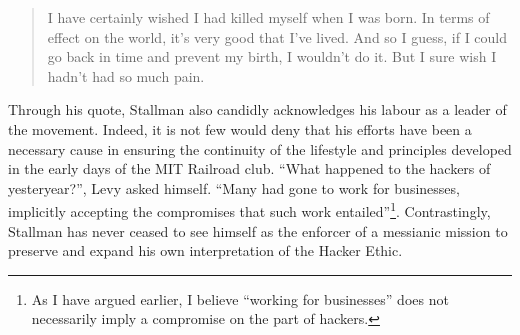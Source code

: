 \begin{quote}
I have certainly wished I had killed myself when I was born. In terms of effect on the world, it's very good that I've lived. And so I guess, if I could go back in time and prevent my birth, I wouldn't do it. But I sure wish I hadn't had so much pain. \citep{levy10}
\end{quote}

Through his quote, Stallman also candidly acknowledges his labour as a leader of the movement. Indeed, it is not few would deny that his efforts have been a necessary cause in ensuring the continuity of the lifestyle and principles developed in the early days of the MIT Railroad club. ``What happened to the hackers of yesteryear?'', Levy asked himself. ``Many had gone to work for businesses, implicitly accepting the compromises that such work entailed''\footnote{As I have argued earlier, I believe ``working for businesses'' does not necessarily imply a compromise on the part of hackers.}. Contrastingly, Stallman has never ceased to see himself as the enforcer of a messianic mission to preserve and expand his own interpretation of the Hacker Ethic.
































